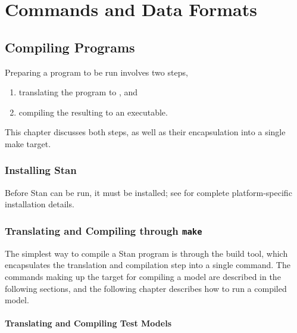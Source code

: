 \part{Commands and Data Formats}


\chapter{Compiling \Stan Programs}

\noindent
Preparing a \Stan program to be run involves two steps,
%
\begin{enumerate}
\item translating the \Stan program to \Cpp, and
\item compiling the resulting \Cpp to an executable.
\end{enumerate}
%
This chapter discusses both steps, as well as their encapsulation into
a single make target.  

\section{Installing Stan}

Before Stan can be run, it must be installed; see
 for complete platform-specific installation
details.

\section{Translating and Compiling through {\tt\bfseries make}}\label{make-models.section}

The simplest way to compile a Stan program is through the 
build tool, which encapsulates the translation and compilation step
into a single command.  The commands making up the  target
for compiling a model are described in the following sections, and the
following chapter describes how to run a compiled model.

\subsection{Translating and Compiling Test Models}

